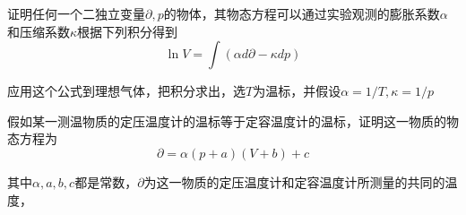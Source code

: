 \begin{question}[p25,7]
    证明任何一个二独立变量$\partial,p$的物体，其物态方程可以通过实验观测的膨胀系数$\alpha$和压缩系数$\kappa$根据下列积分得到
    \begin{equation}
        \ln V=\int (\alpha d\partial-\kappa dp)
    \end{equation}

    应用这个公式到理想气体，把积分求出，选$T$为温标，并假设$\alpha=1/T,\kappa=1/p$
\end{question}

\begin{mdframed}[linewidth=0pt, backgroundcolor=gray!15]
    \begin{pf}
        
    \end{pf}
\end{mdframed}

\begin{question}[p25,8]
    假如某一测温物质的定压温度计的温标等于定容温度计的温标，证明这一物质的物态方程为
    \begin{equation}
        \partial = \alpha(p+a)(V+b)+c
    \end{equation}

    其中$\alpha,a,b,c$都是常数，$\partial$为这一物质的定压温度计和定容温度计所测量的共同的温度，
\end{question}

\begin{mdframed}[linewidth=0pt, backgroundcolor=gray!15]
    \begin{pf}
        
    \end{pf}
\end{mdframed}